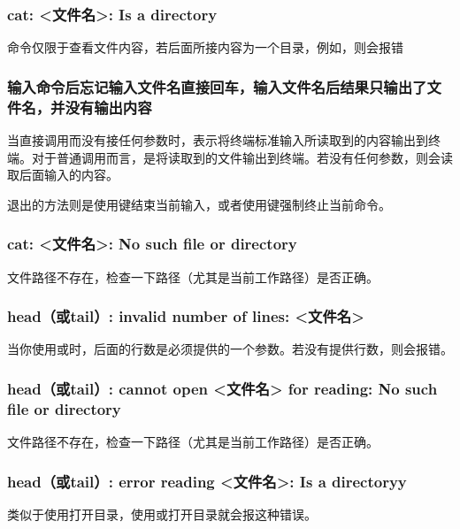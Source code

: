 \subsubsection{cat: <文件名>: Is a directory}

命令仅限于查看文件内容，若后面所接内容为一个目录，例如，则会报错

\subsubsection{输入命令后忘记输入文件名直接回车，输入文件名后结果只输出了文件名，并没有输出内容}

当直接调用而没有接任何参数时，表示将终端标准输入所读取到的内容输出到终端。对于普通调用而言，是将读取到的文件输出到终端。若没有任何参数，则会读取后面输入的内容。

退出的方法则是使用键结束当前输入，或者使用键强制终止当前命令。

\subsubsection{cat: <文件名>: No such file or directory}

文件路径不存在，检查一下路径（尤其是当前工作路径）是否正确。

\subsubsection{head（或tail）: invalid number of lines: <文件名>}

当你使用或时，后面的行数是必须提供的一个参数。若没有提供行数，则会报错。

\subsubsection{head（或tail）: cannot open <文件名> for reading: No such file or directory}

文件路径不存在，检查一下路径（尤其是当前工作路径）是否正确。

\subsubsection{head（或tail）: error reading <文件名>: Is a directoryy}

类似于使用打开目录，使用或打开目录就会报这种错误。

